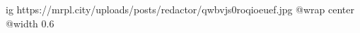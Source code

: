  
 
 
 
 

\ifcmt
  ig https://mrpl.city/uploads/posts/redactor/qwbvjs0roqioeuef.jpg
  @wrap center
  @width 0.6
\fi
